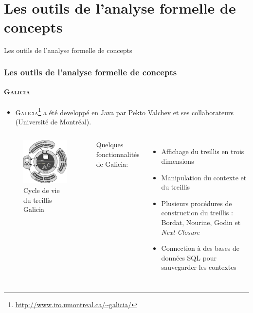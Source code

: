 \documentclass[french]{beamer}
\begin{document}
\section{Les outils de l'analyse formelle de concepts}
\begin{frame}
\huge{\centerline{Les outils de l'analyse formelle de concepts}}
\end{frame}
\begin{frame}
\frametitle{Les outils de l'analyse formelle de concepts}
\framesubtitle{\textsc{Galicia}}
\begin{itemize}
\item \textsc{Galicia}\footnote{\url{http://www.iro.umontreal.ca/~galicia/}} a été developpé en Java par Pekto Valchev et ses collaborateurs (Université de Montréal).
\end{itemize}
\begin{columns}[c] %

\begin{figure}[H]
\begin{center}\includegraphics[scale=0.40]{figures/galicia-life-cycle.png}\end{center}
\caption{Cycle de vie du treillis Galicia}
\label{cap:fig:galicia-life-cycle}
\end{figure}

Quelques fonctionnalités de Galicia:
\begin{itemize}
\item Affichage du treillis en trois dimensions
\item Manipulation du contexte et du treillis
\item Plusieurs procédures de construction du treillis : Bordat, Nourine, Godin et \emph{Next-Closure}
\item Connection à des bases de données SQL pour sauvegarder les contextes
\end{itemize}
\end{columns}

\end{frame}
\end{document}
